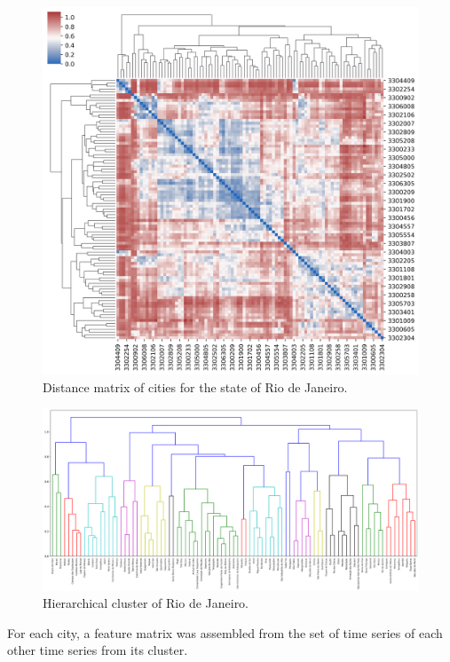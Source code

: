 \documentclass[12pt]{report}
\begin{document}
\begin{figure}[h!]
 \centering
 \includegraphics[scale=0.4]{cluster_corr_RJ.png}
 \caption{Distance matrix of cities for the state of Rio de Janeiro.}
 \label{fig:corr_rj}
\end{figure}


\begin{figure}[h!]
 \centering
 \includegraphics[width=\textwidth]{clusterRJ_06.png}
 \caption{Hierarchical cluster of Rio de Janeiro.}
 \label{fig:cluster_rj}
\end{figure}

For each city, a feature matrix was assembled from the set of time series of 
each other time series from its cluster.
\end{document}
